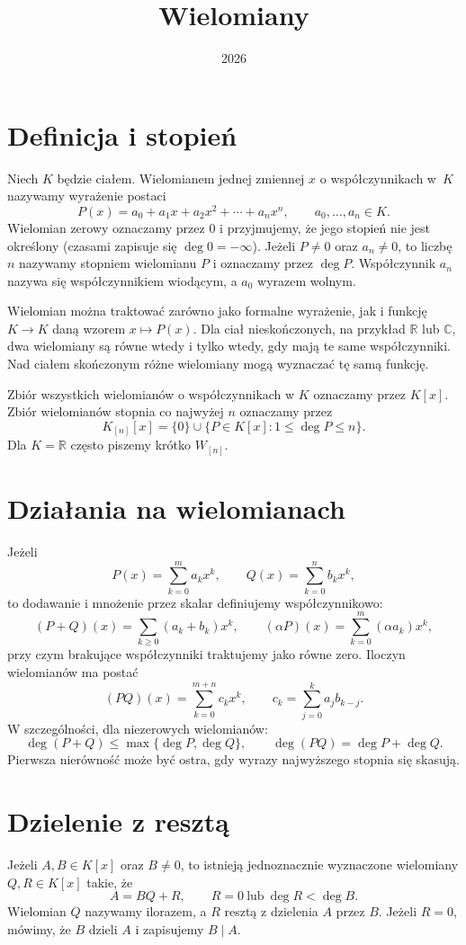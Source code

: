 \documentclass{article}
\title{Wielomiany}
\date{2026}
\begin{document}
\maketitle

\section{Definicja i stopień}
Niech $K$ będzie ciałem. Wielomianem jednej zmiennej $x$ o współczynnikach
w~$K$ nazywamy wyrażenie postaci
\[
    P(x)=a_0+a_1x+a_2x^2+\cdots+a_nx^n,
    \qquad a_0,\ldots,a_n\in K.
\]
Wielomian zerowy oznaczamy przez $0$ i przyjmujemy, że jego stopień nie jest
określony (czasami zapisuje się $\deg 0=-\infty$). Jeżeli $P\neq 0$ oraz
$a_n\neq 0$, to liczbę $n$ nazywamy stopniem wielomianu $P$ i oznaczamy
przez $\deg P$. Współczynnik $a_n$ nazywa się współczynnikiem wiodącym,
a $a_0$ wyrazem wolnym.

Wielomian można traktować zarówno jako formalne wyrażenie, jak i funkcję
$K\to K$ daną wzorem $x\mapsto P(x)$. Dla ciał nieskończonych, na przykład
$\mathbb{R}$ lub $\mathbb{C}$, dwa wielomiany są równe wtedy i tylko wtedy,
gdy mają te same współczynniki. Nad ciałem skończonym różne wielomiany mogą
wyznaczać tę samą funkcję.

Zbiór wszystkich wielomianów o współczynnikach w $K$ oznaczamy przez
$K[x]$. Zbiór wielomianów stopnia co najwyżej $n$ oznaczamy przez
\[
    K_{[n]}[x]=\{0\}\cup\{P\in K[x]\colon 1\leq\deg P\leq n\}.
\]
Dla $K=\mathbb{R}$ często piszemy krótko $W_{[n]}$.

\section{Działania na wielomianach}
Jeżeli
\[
    P(x)=\sum_{k=0}^{m}a_kx^k,\qquad
    Q(x)=\sum_{k=0}^{n}b_kx^k,
\]
to dodawanie i mnożenie przez skalar definiujemy współczynnikowo:
\[
    (P+Q)(x)=\sum_{k\geq 0}(a_k+b_k)x^k,\qquad
    (\alpha P)(x)=\sum_{k=0}^{m}(\alpha a_k)x^k,
\]
przy czym brakujące współczynniki traktujemy jako równe zero. Iloczyn
wielomianów ma postać
\[
    (PQ)(x)=\sum_{k=0}^{m+n}c_kx^k,
    \qquad c_k=\sum_{j=0}^{k}a_jb_{k-j}.
\]
W szczególności, dla niezerowych wielomianów:
\[
    \deg(P+Q)\leq\max\{\deg P,\deg Q\},\qquad
    \deg(PQ)=\deg P+\deg Q.
\]
Pierwsza nierówność może być ostra, gdy wyrazy najwyższego stopnia się
skasują.

\section{Dzielenie z resztą}
Jeżeli $A,B\in K[x]$ oraz $B\neq 0$, to istnieją jednoznacznie wyznaczone
wielomiany $Q,R\in K[x]$ takie, że
\[
    A=BQ+R,\qquad R=0\ \text{lub}\ \deg R<\deg B.
\]
Wielomian $Q$ nazywamy ilorazem, a $R$ resztą z dzielenia $A$ przez $B$.
Jeżeli $R=0$, mówimy, że $B$ dzieli $A$ i zapisujemy $B\mid A$.
\end{document}

